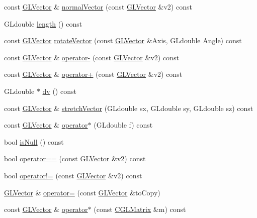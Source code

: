 \begin{DoxyCompactItemize}
const \hyperlink{classGLVector}{\-G\-L\-Vector} \& \hyperlink{classGLVector_a314b71f079b571846833a3beab71f7b0}{normal\-Vector} (const \hyperlink{classGLVector}{\-G\-L\-Vector} \&v2) const 
\item 
\-G\-Ldouble \hyperlink{classGLVector_a3574d0c6514a5de5838d6e487ec61408}{length} () const 
\item 
const \hyperlink{classGLVector}{\-G\-L\-Vector} \hyperlink{classGLVector_aec8ac775e13b7ec0060198625d1ab747}{rotate\-Vector} (const \hyperlink{classGLVector}{\-G\-L\-Vector} \&\-Axis, \-G\-Ldouble \-Angle) const 
\item 
const \hyperlink{classGLVector}{\-G\-L\-Vector} \& \hyperlink{classGLVector_a05483ab1f6d777d33d681ee4fe3f6498}{operator-\/} (const \hyperlink{classGLVector}{\-G\-L\-Vector} \&v2) const 
\item 
const \hyperlink{classGLVector}{\-G\-L\-Vector} \& \hyperlink{classGLVector_a34942208c4b7c3a20bfc9b4e8a6b4ac5}{operator+} (const \hyperlink{classGLVector}{\-G\-L\-Vector} \&v2) const 
\item 
\-G\-Ldouble $\ast$ \hyperlink{classGLVector_a3408513f72b99c63c81702f2e2ccba96}{dv} () const 
\item 
const \hyperlink{classGLVector}{\-G\-L\-Vector} \& \hyperlink{classGLVector_acf6d19c0b9b3176761b77aa0aac408b2}{stretch\-Vector} (\-G\-Ldouble sx, \-G\-Ldouble sy, \-G\-Ldouble sz) const 
\item 
const \hyperlink{classGLVector}{\-G\-L\-Vector} \& \hyperlink{classGLVector_a3e9e3340cc0a39932462da5d2e92468d}{operator$\ast$} (\-G\-Ldouble f) const 
\item 
bool \hyperlink{classGLVector_a5b14415969ab6c060ee232797e79d14f}{is\-Null} () const 
\item 
bool \hyperlink{classGLVector_ab95e61904b30cdae641a0c583548a557}{operator==} (const \hyperlink{classGLVector}{\-G\-L\-Vector} \&v2) const 
\item 
bool \hyperlink{classGLVector_ab5edfaa1436322090272efd0e407a03a}{operator!=} (const \hyperlink{classGLVector}{\-G\-L\-Vector} \&v2) const 
\item 
\hyperlink{classGLVector}{\-G\-L\-Vector} \& \hyperlink{classGLVector_ae0e364adbb7543f13c47cee12654ec69}{operator=} (const \hyperlink{classGLVector}{\-G\-L\-Vector} \&to\-Copy)
\item 
const \hyperlink{classGLVector}{\-G\-L\-Vector} \& \hyperlink{classGLVector_af188ad329ae3eca84fa87d77f4523428}{operator$\ast$} (const \hyperlink{classCGLMatrix}{\-C\-G\-L\-Matrix} \&m) const 
\item 

\end{DoxyCompactItemize}
